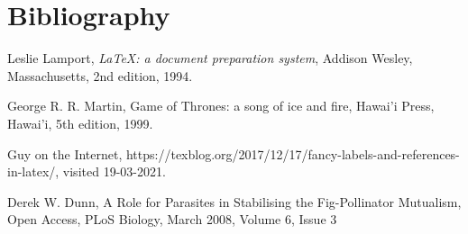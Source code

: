 \section{Bibliography}

\begin{thebibliography}{9}

  Leslie Lamport,
  \textit{\LaTeX: a document preparation system},
  Addison Wesley, Massachusetts,
  2nd edition,
  1994.
  
  George R. R. Martin,
  Game of Thrones: a song of ice and fire,
  Hawai'i Press, Hawai'i,
  5th edition,
  1999.
  
  Guy on the Internet,
  https://texblog.org/2017/12/17/fancy-labels-and-references-in-latex/,
  visited 19-03-2021.

  Derek W. Dunn,
  A Role for Parasites in Stabilising the Fig-Pollinator Mutualism,
  Open Access, PLoS Biology,
  March 2008,
  Volume 6,
  Issue 3

\end{thebibliography}